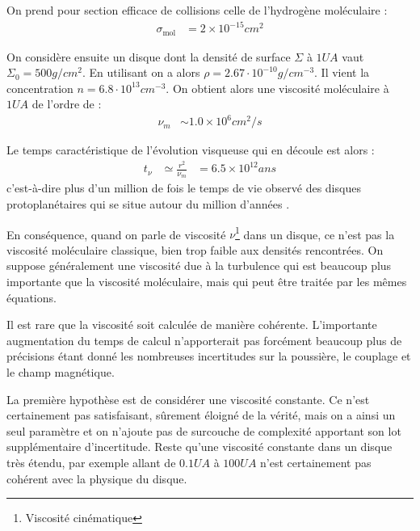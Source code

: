 On prend pour section efficace de collisions celle de l'hydrogène moléculaire \citep{chapman1970mathematical} :
\begin{align}
\sigma_\text{mol} &= 2\times 10^{-15}\unit{cm^2}
\end{align}

On considère ensuite un disque dont la densité de surface $\Sigma$ à $1\unit{UA}$ vaut $\Sigma_0 = 500\unit{g/cm^2}$. En utilisant  on a alors $\rho=2.67\cdot 10^{-10}\unit{g/cm^{-3}}$. Il vient la concentration $n=6.8\cdot 10^{13}\unit{cm^{-3}}$. On obtient alors une viscosité moléculaire à $1\unit{UA}$ de l'ordre de : 
\begin{align}
\nu_m &\sim 1.0\times 10^6\unit{cm^2/s}
\end{align}

Le temps caractéristique de l'évolution visqueuse qui en découle est alors : 
\begin{align}
t_\nu &\simeq \frac{r^2}{\nu_m} &= 6.5\times 10^{12}\unit{ans}
\end{align}
c'est-à-dire plus d'un million de fois le temps de vie observé des disques protoplanétaires qui se situe autour du million d'années \citep{williams2011protoplanetary}.

En conséquence, quand on parle de viscosité $\nu$\footnote{Viscosité cinématique} dans un disque, ce n'est pas la viscosité moléculaire classique, bien trop faible aux densités rencontrées. On suppose généralement une viscosité due à la turbulence qui est beaucoup plus importante que la viscosité moléculaire, mais qui peut être traitée par les mêmes équations. 


Il est rare que la viscosité soit calculée de manière cohérente. L'importante augmentation du temps de calcul n'apporterait pas forcément beaucoup plus de précisions étant donné les nombreuses incertitudes sur la poussière, le couplage et le champ magnétique. 

\bigskip

La première hypothèse est de considérer une viscosité constante. Ce n'est certainement pas satisfaisant, sûrement éloigné de la vérité, mais on a ainsi un seul paramètre et on n'ajoute pas de surcouche de complexité apportant son lot supplémentaire d'incertitude. Reste qu'une viscosité constante dans un disque très étendu, par exemple allant de $0.1\unit{UA}$ à $100\unit{UA}$ n'est certainement pas cohérent avec la physique du disque. 

